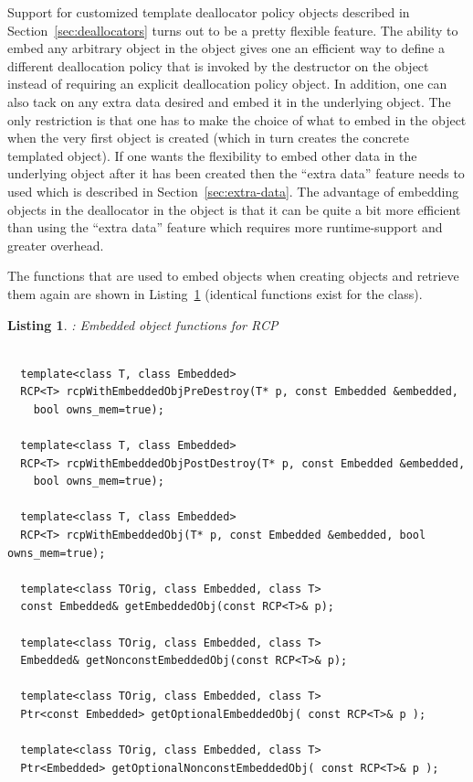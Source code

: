\documentclass[pdf,ps2pdf,11pt]{SANDreport}
\newtheorem{listing}{Listing}
\begin{document}
Support for customized template deallocator policy objects described
in Section~\ref{sec:deallocators} turns out to be a pretty flexible
feature.  The ability to embed any arbitrary object in the
{} object gives one an efficient way to define a
different deallocation policy that is invoked by the destructor on the
object instead of requiring an explicit deallocation policy object.
In addition, one can also tack on any extra data desired and embed it
in the underlying {} object.  The only restriction is
that one has to make the choice of what to embed in the
{} object when the very first {} object is
created (which in turn creates the concrete templated
{} object).  If one wants the flexibility to embed
other data in the underlying {} object after it has been
created then the ``extra data'' feature needs to used which is
described in Section~\ref{sec:extra-data}.  The advantage of embedding
objects in the deallocator in the {} object is that
it can be quite a bit more efficient than using the ``extra data''
feature which requires more runtime-support and greater overhead.

The functions that are used to embed objects when creating {}
objects and retrieve them again are shown in
Listing~\ref{listing:RCP-embedded-obj} (identical functions exist for
the {} class).

\begin{listing}: Embedded object functions for RCP \\
\label{listing:RCP-embedded-obj}
{\small\begin{verbatim}
 
  template<class T, class Embedded>
  RCP<T> rcpWithEmbeddedObjPreDestroy(T* p, const Embedded &embedded,
    bool owns_mem=true);
  
  template<class T, class Embedded>
  RCP<T> rcpWithEmbeddedObjPostDestroy(T* p, const Embedded &embedded,
    bool owns_mem=true);
  
  template<class T, class Embedded>
  RCP<T> rcpWithEmbeddedObj(T* p, const Embedded &embedded, bool owns_mem=true);
  
  template<class TOrig, class Embedded, class T> 
  const Embedded& getEmbeddedObj(const RCP<T>& p);
  
  template<class TOrig, class Embedded, class T>
  Embedded& getNonconstEmbeddedObj(const RCP<T>& p);
  
  template<class TOrig, class Embedded, class T>
  Ptr<const Embedded> getOptionalEmbeddedObj( const RCP<T>& p );
  
  template<class TOrig, class Embedded, class T>
  Ptr<Embedded> getOptionalNonconstEmbeddedObj( const RCP<T>& p );
\end{verbatim}}
\end{listing}
\end{document}
